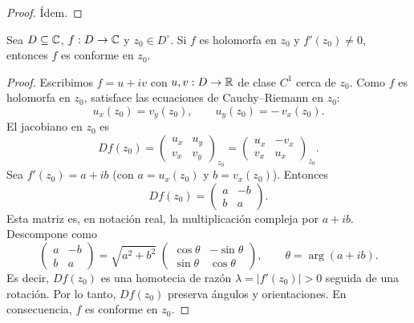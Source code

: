 \begin{proof}
    Ídem.
\end{proof}

\begin{proposition}
    Sea $D \subseteq \mathbb{C}$, $f : D \to \mathbb{C}$ y $z_0 \in D^\circ$. 
    Si $f$ es holomorfa en $z_0$ y $f'(z_0) \neq 0$, entonces $f$ es conforme en $z_0$.
\end{proposition}

\begin{proof}
    Escribimos $f=u+iv$ con $u,v:D\to\mathbb{R}$ de clase $C^1$ cerca de $z_0$. 
    Como $f$ es holomorfa en $z_0$, satisface las ecuaciones de Cauchy--Riemann en $z_0$:
    \begin{equation*}
        u_x(z_0)=v_y(z_0), \qquad u_y(z_0)=-\,v_x(z_0).
    \end{equation*}
    El jacobiano en $z_0$ es
    \begin{equation*}
        Df(z_0)=\begin{pmatrix} u_x & u_y \\ v_x & v_y \end{pmatrix}_{z_0}
                =\begin{pmatrix} u_x & -v_x \\ v_x & u_x \end{pmatrix}_{z_0}.
    \end{equation*}
    Sea $f'(z_0)=a+ib$ (con $a=u_x(z_0)$ y $b=v_x(z_0)$). Entonces
    \begin{equation*}
        Df(z_0)=\begin{pmatrix} a & -b \\ b & a \end{pmatrix}.
    \end{equation*}
    Esta matriz es, en notación real, la multiplicación compleja por $a+ib$. Descompone como
    \begin{equation*}
        \begin{pmatrix} a & -b \\ b & a \end{pmatrix}
        = \sqrt{a^2+b^2}\;
        \begin{pmatrix} \cos\theta & -\sin\theta \\ \sin\theta & \cos\theta \end{pmatrix},
        \qquad \theta=\arg(a+ib).
    \end{equation*}
    Es decir, $Df(z_0)$ es una homotecia de razón $\lambda=\lvert f'(z_0)\rvert>0$ seguida de una rotación. 
    Por lo tanto, $Df(z_0)$ preserva ángulos y orientaciones. En consecuencia, $f$ es conforme en $z_0$.
\end{proof}



